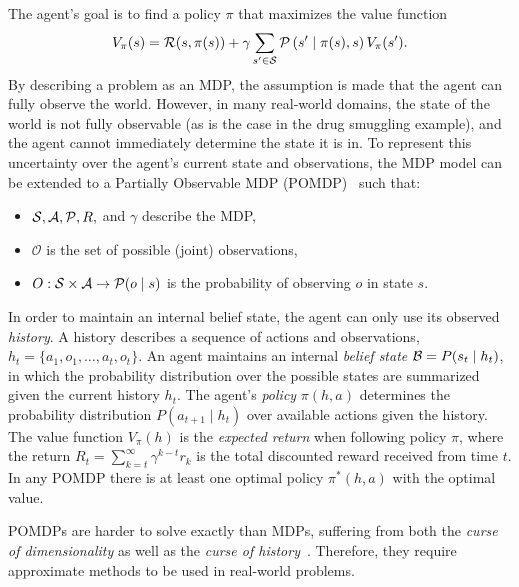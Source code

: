 \documentclass[conference]{IEEEtran}
\begin{document}

The agent's goal is to find a policy $\pi$ that maximizes the value function
\begin{equation}
V_{\pi}(s) = \R(s,\pi(s)) + \gamma\sum\limits_{s^\prime\in\S}\P\left(s^\prime\mid\pi(s),s\right)V_{\pi}(s^\prime).
\end{equation} 
By describing a problem as an MDP, the assumption is made that the agent can fully observe the world. However, in many real-world domains, the state of the world is not fully observable (as is the case in the drug smuggling example), and the agent cannot immediately determine the state it is in. To represent this uncertainty over the agent's current state and observations, the MDP model can be extended to a Partially Observable MDP (POMDP)~\cite{aastrom1965optimal,pomdp} such that: 

\begin{itemize}
\item $\S,\mathcal{A},\P,R,$ and $\gamma$ describe the MDP,
\item $\mathcal{O}$ is the set of possible (joint) observations,
\item $O:\S\times\mathcal{A}\to\P(o\mid s)$ is the probability of observing $o$ in state $s$. 
\end{itemize}

In order to maintain an internal belief state, the agent can only use its observed \emph{history}. A history describes a sequence of actions and observations, $h_t = \{a_1, o_1, \ldots, a_t, o_t\}$. An agent maintains an internal {\it belief state} $\B = P(s_t\mid  h_t)$, in which the probability distribution over the possible states are summarized given the current history $h_t$. The agent's \emph{policy} $\pi(h,a)$ determines the probability distribution $P(a_{t+1}\mid h_t)$ over available actions given the history. The value function $V_{\pi}(h)$ is the {\it expected return} when following policy $\pi$, where the return $R_t = \sum\nolimits_{k=t}^{\infty} \gamma^{k−t}r_k$ is the total discounted reward received from time $t$. In any POMDP there is at least one optimal policy $\pi^*(h, a)$ with the optimal value.

POMDPs are harder to solve exactly than MDPs, suffering from both the {\it curse of dimensionality} as well as the {\it curse of history}~\cite{pineau2006anytime}. Therefore, they require approximate methods to be used in real-world problems.
\end{document}
